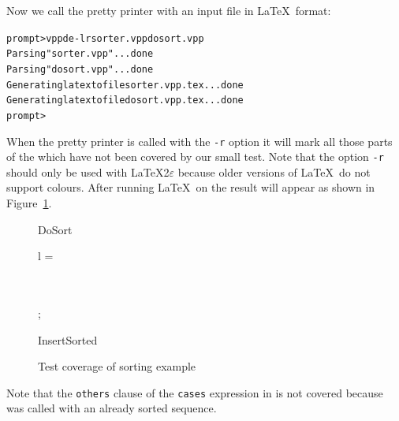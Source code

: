 \documentclass[\pformat,12pt]{article}
\newcommand{\vdmde}{vppde}
\begin{document}
Now we call the pretty printer with an input file in \LaTeX\ format:


\begin{alltt}
prompt> \vdmde -lr sorter.vpp dosort.vpp 
Parsing "sorter.vpp" ... done
Parsing "dosort.vpp" ... done
Generating latex to file sorter.vpp.tex ... done
Generating latex to file dosort.vpp.tex ... done
prompt>
\end{alltt}

When the pretty printer is called with the {\tt -r} option it will
mark all those parts of the  which have not been covered by our small
test. Note that the option {\tt -r} should only be used with
\LaTeX2$\varepsilon$ because older versions of \LaTeX\ do not
support colours. After running \LaTeX\ on
the result will appear as shown in Figure~\ref{fig:tc-sort}.

\begin{figure}[tbh]
\small{
\begin{vdm}
\begin{fn}[e]{DoSort}%
\signature{\seqof*{\Real } \To \seqof*{\Real }}
\If l = \seq{}
\Then\\ \seq{}
\Else\\ \begin{letexpr}
\end{letexpr}\\
\Fi;\\
\end{fn}
\begin{fn}[e]{InsertSorted}%
\signature{PosReal \Mult {} \To {}}
\begin{Cases}{\True }
\end{Cases}
\end{fn}
\end{vdm}}
\caption{Test coverage of sorting example}
\label{fig:tc-sort}
\end{figure}

Note that the {\tt others} clause of the {\tt cases} expression in
 is not covered because
 was
called with an already sorted sequence.
\end{document}
